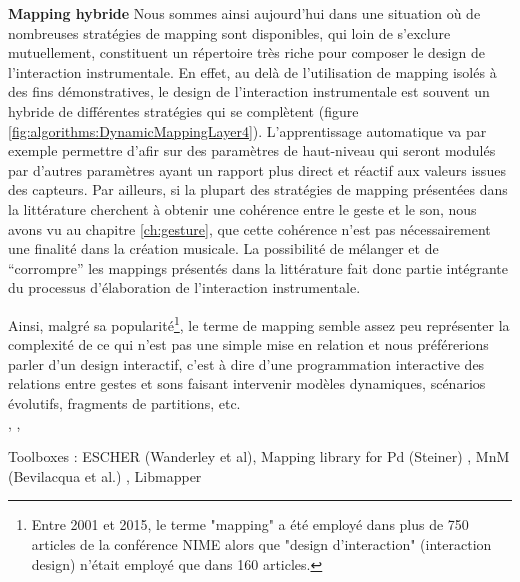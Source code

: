 \par{\textbf{Mapping hybride}} Nous sommes ainsi aujourd'hui dans une situation où de nombreuses stratégies de mapping sont disponibles, qui loin de s'exclure mutuellement, constituent un répertoire très riche pour composer le design de l'interaction instrumentale. En effet, au delà de l'utilisation de mapping isolés à des fins démonstratives, le design de l'interaction instrumentale est souvent un hybride de différentes stratégies qui se complètent (figure \ref{fig:algorithms:DynamicMappingLayer4}). L'apprentissage automatique va par exemple permettre d'afir sur des paramètres de haut-niveau qui seront modulés par d'autres paramètres ayant un rapport plus direct et réactif aux valeurs issues des capteurs. Par ailleurs, si la plupart des stratégies de mapping présentées dans la littérature cherchent à obtenir une cohérence entre le geste et le son, nous avons vu au chapitre \ref{ch:gesture}, que cette cohérence n'est pas nécessairement une finalité dans la création musicale. La possibilité de mélanger et de ``corrompre'' les mappings présentés dans la littérature fait donc partie intégrante du processus d'élaboration de l'interaction instrumentale.

\indent Ainsi, malgré sa popularité\footnote{Entre 2001 et 2015, le terme "mapping" a été employé dans plus de 750 articles de la conférence \gls{NIME} alors que "design d'interaction" (interaction design) n'était employé que dans 160 articles.}, le terme de mapping semble assez peu représenter la complexité de ce qui n'est pas une simple mise en relation et nous préférerions parler d'un design interactif, c'est à dire d'une programmation interactive des relations entre gestes et sons faisant intervenir modèles dynamiques, scénarios évolutifs, fragments de partitions, etc.\\


\cite{momeni_dynamic_2006}, \cite{winkler_making_1995}, 

Toolboxes : ESCHER (Wanderley et al)\cite{wanderley_escher-modeling_1998}, Mapping library for Pd (Steiner) \cite{steiner_towards_2006}, MnM (Bevilacqua et al.) \cite{bevilacqua_mnm_2005}, Libmapper

